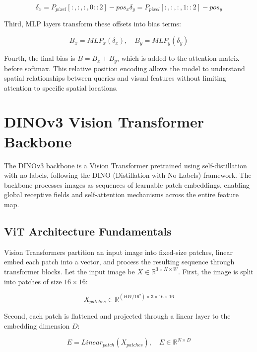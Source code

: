 \documentclass[12pt,a4paper]{article}
\begin{document}
\begin{equation}
\delta_x = P_{pixel}[:, :, :, 0::2] - pos_x
\delta_y = P_{pixel}[:, :, :, 1::2] - pos_y
\end{equation}

Third, MLP layers transform these offsets into bias terms:

\begin{equation}
B_x = MLP_x(\delta_x), \quad B_y = MLP_y(\delta_y)
\end{equation}

Fourth, the final bias is $B = B_x + B_y$, which is added to the attention matrix before softmax. This relative position encoding allows the model to understand spatial relationships between queries and visual features without limiting attention to specific spatial locations.

\section{DINOv3 Vision Transformer Backbone}

The DINOv3 backbone is a Vision Transformer pretrained using self-distillation with no labels, following the DINO (Distillation with No Labels) framework. The backbone processes images as sequences of learnable patch embeddings, enabling global receptive fields and self-attention mechanisms across the entire feature map.

\subsection{ViT Architecture Fundamentals}

Vision Transformers partition an input image into fixed-size patches, linear embed each patch into a vector, and process the resulting sequence through transformer blocks. Let the input image be $X \in \mathbb{R}^{3 \times H \times W}$. First, the image is split into patches of size $16 \times 16$:

\begin{equation}
X_{patches} \in \mathbb{R}^{(HW/16^2) \times 3 \times 16 \times 16}
\end{equation}

Second, each patch is flattened and projected through a linear layer to the embedding dimension $D$:

\begin{equation}
E = Linear_{patch}(X_{patches}), \quad E \in \mathbb{R}^{N \times D}
\end{equation}
\end{document}
